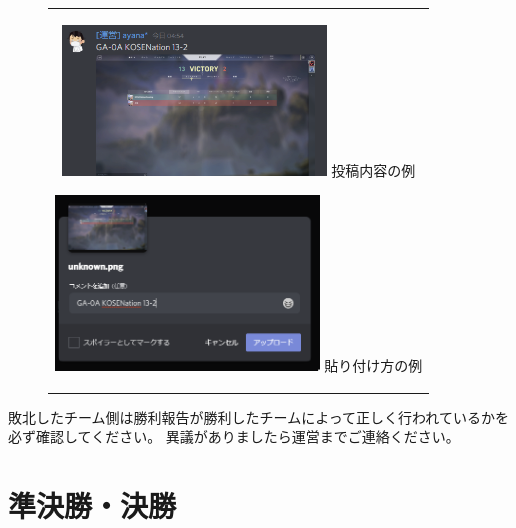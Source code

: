\documentclass[uplatex,dvipdfmx]{jsarticle}
\begin{document}
			\begin{figure}[H]
				\begin{center}
					\begin{tabular}{c}
						\begin{minipage}{0.5\hsize}
							\begin{center}
								\includegraphics[width=70mm]{result.png}
								\hspace{1.6cm} 投稿内容の例
							\end{center}
						\end{minipage}

						\begin{minipage}{0.5\hsize}
							\begin{center}
								\includegraphics[width=70mm]{example.png}
								\hspace{1.6cm} 貼り付け方の例
							\end{center}
						\end{minipage}
					\end{tabular}
				\end{center}
			\end{figure}
			敗北したチーム側は勝利報告が勝利したチームによって正しく行われているかを必ず確認してください。
			異議がありましたら運営までご連絡ください。

\section{準決勝・決勝}
\end{document}
